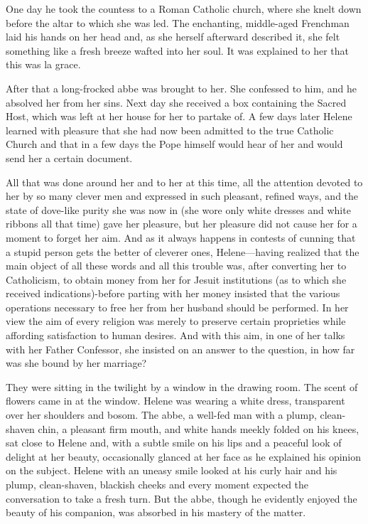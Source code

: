 One day he took the countess to a Roman Catholic church, where
she knelt down before the altar to which she was led. The
enchanting, middle-aged Frenchman laid his hands on her head and,
as she herself afterward described it, she felt something like a
fresh breeze wafted into her soul. It was explained to her that
this was la grace.

After that a long-frocked abbe was brought to her. She confessed
to him, and he absolved her from her sins. Next day she received
a box containing the Sacred Host, which was left at her house for
her to partake of. A few days later Helene learned with pleasure
that she had now been admitted to the true Catholic Church and
that in a few days the Pope himself would hear of her and would
send her a certain document.

All that was done around her and to her at this time, all the
attention devoted to her by so many clever men and expressed in
such pleasant, refined ways, and the state of dove-like purity
she was now in (she wore only white dresses and white ribbons all
that time) gave her pleasure, but her pleasure did not cause her
for a moment to forget her aim. And as it always happens in
contests of cunning that a stupid person gets the better of
cleverer ones, Helene---having realized that the main object of
all these words and all this trouble was, after converting her to
Catholicism, to obtain money from her for Jesuit institutions (as
to which she received indications)-before parting with her money
insisted that the various operations necessary to free her from
her husband should be performed. In her view the aim of every
religion was merely to preserve certain proprieties while
affording satisfaction to human desires. And with this aim, in
one of her talks with her Father Confessor, she insisted on an
answer to the question, in how far was she bound by her marriage?

They were sitting in the twilight by a window in the drawing
room. The scent of flowers came in at the window. Helene was
wearing a white dress, transparent over her shoulders and
bosom. The abbe, a well-fed man with a plump, clean-shaven chin,
a pleasant firm mouth, and white hands meekly folded on his
knees, sat close to Helene and, with a subtle smile on his lips
and a peaceful look of delight at her beauty, occasionally
glanced at her face as he explained his opinion on the
subject. Helene with an uneasy smile looked at his curly hair and
his plump, clean-shaven, blackish cheeks and every moment
expected the conversation to take a fresh turn. But the abbe,
though he evidently enjoyed the beauty of his companion, was
absorbed in his mastery of the matter.

